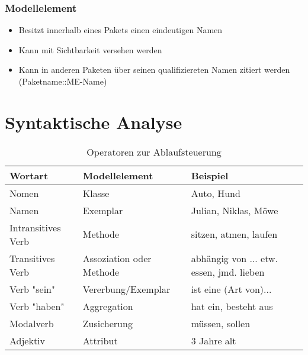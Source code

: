 \subsubsection{Modellelement}
\begin{itemize}
    \item Besitzt innerhalb eines Pakets einen eindeutigen Namen
    \item Kann mit Sichtbarkeit versehen werden
    \item Kann in anderen Paketen über seinen qualifiziereten Namen zitiert werden (Paketname::ME-Name)
\end{itemize}


\section{Syntaktische Analyse}
\begin{table}[h]
\begin{tabular}{l|l|l}
Wortart            & Modellelement            & Beispiel                                 \\
\hline
Nomen              & Klasse                   & Auto, Hund                               \\
Namen              & Exemplar                 & Julian, Niklas, Möwe                     \\
Intransitives Verb & Methode                  & sitzen, atmen, laufen                    \\
Transitives Verb   & Assoziation oder Methode & abhängig von ... etw. essen, jmd. lieben \\
Verb "sein"        & Vererbung/Exemplar       & ist eine (Art von)...                    \\
Verb "haben"       & Aggregation              & hat ein, besteht aus                     \\
Modalverb          & Zusicherung              & müssen, sollen                           \\
Adjektiv           & Attribut                 & 3 Jahre alt               
\end{tabular}
\caption{Operatoren zur Ablaufsteuerung}
\label{tab:ablaufsteuerung}
\end{table}

